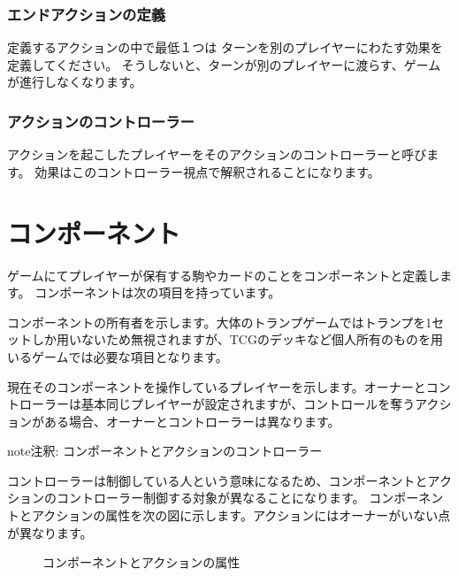 \documentclass[letterpaper,10pt,dvipdfmx]{sphinxmanual}
\begin{document}
\subsubsection{エンドアクションの定義}
\label{\detokenize{core/core:id9}}
\sphinxAtStartPar
定義するアクションの中で最低１つは
ターンを別のプレイヤーにわたす効果を定義してください。
そうしないと、ターンが別のプレイヤーに渡らす、ゲームが進行しなくなります。


\subsubsection{アクションのコントローラー}
\label{\detokenize{core/core:id10}}
\sphinxAtStartPar
アクションを起こしたプレイヤーをそのアクションのコントローラーと呼びます。
効果はこのコントローラー視点で解釈されることになります。


\section{コンポーネント}
\label{\detokenize{core/core:component}}\label{\detokenize{core/core:id11}}
\sphinxAtStartPar
ゲームにてプレイヤーが保有する駒やカードのことをコンポーネントと定義します。
コンポーネントは次の項目を持っています。
\begin{description}
\sphinxAtStartPar
コンポーネントの所有者を示します。大体のトランプゲームではトランプを1セットしか用いないため無視されますが、TCGのデッキなど個人所有のものを用いるゲームでは必要な項目となります。

\sphinxAtStartPar
現在そのコンポーネントを操作しているプレイヤーを示します。オーナーとコントローラーは基本同じプレイヤーが設定されますが、コントロールを奪うアクションがある場合、オーナーとコントローラーは異なります。

\end{description}

\begin{sphinxadmonition}{note}{注釈:}
\sphinxAtStartPar
コンポーネントとアクションのコントローラー

\sphinxAtStartPar
コントローラーは制御している人という意味になるため、コンポーネントとアクションのコントローラー制御する対象が異なることになります。
コンポーネントとアクションの属性を次の図に示します。アクションにはオーナーがいない点が異なります。

\begin{figure}[H]
\centering
\capstart

\noindent{}
\caption{コンポーネントとアクションの属性}\label{\detokenize{core/core:id44}}\end{figure}
\end{sphinxadmonition}
\end{document}
